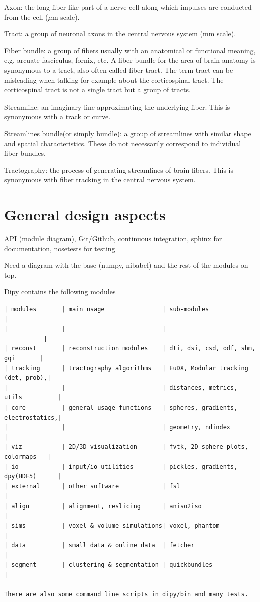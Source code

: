 \documentclass{bioinfo}
\begin{document}
Axon: the long fiber-like part of a nerve cell along which impulses are conducted from the cell ($\mu$m scale). 

Tract: a group of neuronal axons in the central nervous system (mm scale).

Fiber bundle: a group of fibers usually with an anatomical or functional meaning, e.g.
arcuate fasciculus, fornix, etc. A fiber bundle for the area of brain anatomy is synonymous to a
tract, also often called fiber tract. The term tract can be misleading when talking for example about
the corticospinal tract. The corticospinal tract is not a single tract but a group of tracts.

Streamline: an imaginary line approximating the underlying fiber. This is synonymous with a track or curve. 

Streamlines bundle(or simply bundle): a group of streamlines with similar shape and spatial characteristics. These do not necessarily correspond to individual fiber bundles. 

Tractography: the process of generating streamlines of brain fibers. This is synonymous with fiber tracking in the central nervous system.


\section{General design aspects}

API (module diagram), Git/Github, continuous integration, sphinx for documentation, nosetests for testing

Need a diagram with the base (numpy, nibabel) and the rest of the modules on top.

Dipy contains the following modules

\tiny
\begin{verbatim}
| modules       | main usage                | sub-modules                        |
| ------------- | ------------------------- | ---------------------------------- |
| reconst       | reconstruction modules    | dti, dsi, csd, odf, shm, gqi       |
| tracking      | tractography algorithms   | EuDX, Modular tracking (det, prob),|
|               |                           | distances, metrics, utils          |
| core          | general usage functions   | spheres, gradients, electrostatics,|
|               |                           | geometry, ndindex                  |       
| viz           | 2D/3D visualization       | fvtk, 2D sphere plots, colormaps   |
| io            | input/io utilities        | pickles, gradients, dpy(HDF5)      |
| external      | other software            | fsl                                |
| align         | alignment, reslicing      | aniso2iso                          |
| sims          | voxel & volume simulations| voxel, phantom                     |
| data          | small data & online data  | fetcher                            |
| segment       | clustering & segmentation | quickbundles                       |

There are also some command line scripts in dipy/bin and many tests.
\end{verbatim}
\normalsize
\end{document}
